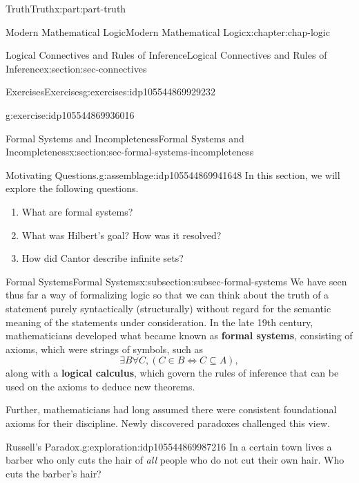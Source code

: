 \documentclass[oneside,10pt,]{book}
\newcommand{\terminology}[1]{\textbf{#1}}
\numberwithin{equation}{section}
\begin{document}
\begin{partptx}{Truth}{}{Truth}{}{}{x:part:part-truth}
\begin{chapterptx}{Modern Mathematical Logic}{}{Modern Mathematical Logic}{}{}{x:chapter:chap-logic}
\begin{sectionptx}{Logical Connectives and Rules of Inference}{}{Logical Connectives and Rules of Inference}{}{}{x:section:sec-connectives}
\begin{exercises-subsection-numberless}{Exercises}{}{Exercises}{}{}{g:exercises:idp105544869929232}
\begin{divisionexercise}{2}{}{}{g:exercise:idp105544869936016}%
%
\end{divisionexercise}%
\end{exercises-subsection-numberless}
\end{sectionptx}
%
%
\typeout{************************************************}
\typeout{************************************************}
%
\begin{sectionptx}{Formal Systems and Incompleteness}{}{Formal Systems and Incompleteness}{}{}{x:section:sec-formal-systems-incompleteness}
\begin{assemblage}{Motivating Questions.}{g:assemblage:idp105544869941648}%
In this section, we will explore the following questions. %
\begin{enumerate}
\item{}What are formal systems?%
\item{}What was Hilbert's goal? How was it resolved?%
\item{}How did Cantor describe infinite sets?%
\end{enumerate}
%
\end{assemblage}
%
%
\typeout{************************************************}
\typeout{************************************************}
%
\begin{subsectionptx}{Formal Systems}{}{Formal Systems}{}{}{x:subsection:subsec-formal-systems}
We have seen thus far a way of formalizing logic so that we can think about the truth of a statement purely syntactically (structurally) without regard for the semantic meaning of the statements under consideration. In the late 19th century, mathematicians developed what became known as \terminology{formal systems}, consisting of axioms, which were strings of symbols, such as%
\begin{equation*}
\exists B \forall C, (C\in B \Leftrightarrow C\subseteq A),
\end{equation*}
along with a \terminology{logical calculus}, which govern the rules of inference that can be used on the axioms to deduce new theorems.%
\par
Further, mathematicians had long assumed there were consistent foundational axioms for their discipline. Newly discovered paradoxes challenged this view.%
\begin{exploration}{Russell's Paradox.}{g:exploration:idp105544869987216}%
In a certain town lives a barber who only cuts the hair of \emph{all} people who do not cut their own hair. Who cuts the barber's hair?%

\end{exploration}
\end{subsectionptx}
\end{sectionptx}
\end{chapterptx}
\end{partptx}
\end{document}
